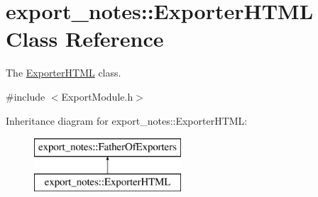 \hypertarget{classexport__notes_1_1_exporter_h_t_m_l}{\section{export\-\_\-notes\-:\-:Exporter\-H\-T\-M\-L Class Reference}
\label{classexport__notes_1_1_exporter_h_t_m_l}
}


The \hyperlink{classexport__notes_1_1_exporter_h_t_m_l}{Exporter\-H\-T\-M\-L} class.  




{\ttfamily \#include $<$Export\-Module.\-h$>$}

Inheritance diagram for export\-\_\-notes\-:\-:Exporter\-H\-T\-M\-L\-:\begin{figure}[H]
\begin{center}
\leavevmode
\includegraphics[height=2.000000cm]{classexport__notes_1_1_exporter_h_t_m_l}
\end{center}
\end{figure}
